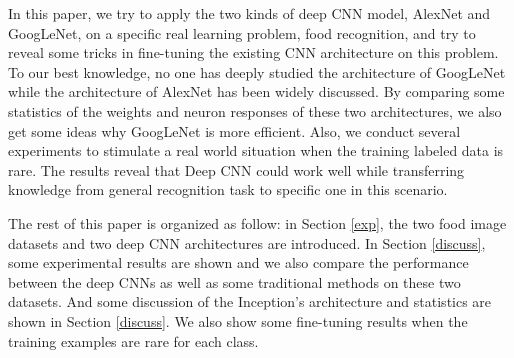 In this paper, we try to apply the two kinds of deep CNN model, AlexNet and GoogLeNet, on a specific real learning problem, food recognition, and try to reveal some tricks in fine-tuning the existing CNN architecture on this problem. To our best knowledge, no one has deeply studied the architecture of GoogLeNet while the architecture of AlexNet has been widely discussed. By comparing some statistics of the weights and neuron responses of these two architectures, we also get some ideas why GoogLeNet is more efficient. Also, we conduct several experiments to stimulate a real world situation when the training labeled data is rare. The results reveal that Deep CNN could work well while transferring knowledge from general recognition task to specific one in this scenario.

The rest of this paper is organized as follow: in Section \ref{exp}, the two food image datasets and two deep CNN architectures are introduced. In Section \ref{discuss}, some experimental results are shown and we also compare the performance between the deep CNNs as well as some traditional methods on these two datasets. And some discussion of the Inception's architecture and statistics are shown in Section \ref{discuss}. We also show some fine-tuning results when the training examples are rare for each class.
